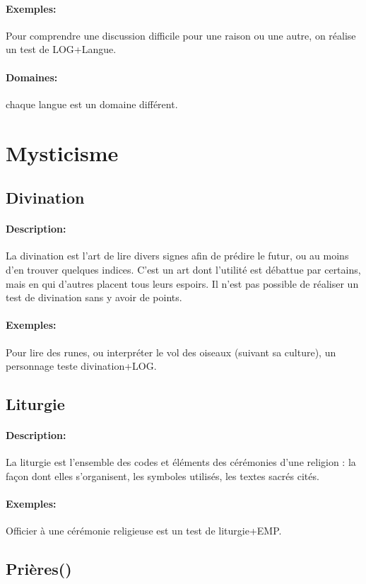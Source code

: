 \documentclass[10pt,a4paper,twocolumn]{book}
\begin{document}
\paragraph{Exemples:}Pour comprendre une discussion difficile pour une raison ou une autre, on réalise un test de LOG+Langue.
\paragraph{Domaines:}chaque langue est un domaine différent.

\section{Mysticisme}
\subsection{Divination}
\paragraph{Description:}La divination est l'art de lire divers signes afin de prédire le futur, ou au moins d'en trouver quelques indices. C'est un art dont l'utilité est débattue par certains, mais en qui d'autres placent tous leurs espoirs. Il n'est pas possible de réaliser un test de divination sans y avoir de points.
\paragraph{Exemples:}Pour lire des runes, ou interpréter le vol des oiseaux (suivant sa culture), un personnage teste divination+LOG.
\subsection{Liturgie}
\paragraph{Description:}La liturgie est l'ensemble des codes et éléments des cérémonies d'une religion : la façon dont elles s'organisent, les symboles utilisés, les textes sacrés cités.
\paragraph{Exemples:}Officier à une cérémonie religieuse est un test de liturgie+EMP.
\subsection{Prières()}
\end{document}
